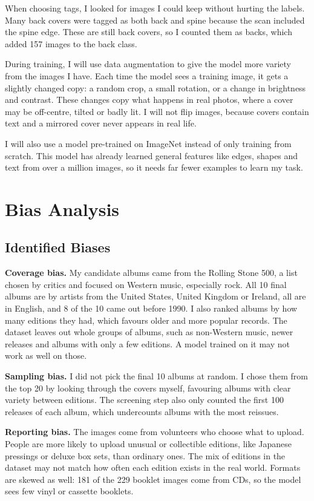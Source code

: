 \documentclass[10pt,a4paper,twocolumn]{article}
\begin{document}
When choosing tags, I looked for images I could keep without hurting the labels. Many back covers were tagged as both back and spine because the scan included the spine edge. These are still back covers, so I counted them as backs, which added 157 images to the back class.

During training, I will use data augmentation to give the model more variety from the images I have. Each time the model sees a training image, it gets a slightly changed copy: a random crop, a small rotation, or a change in brightness and contrast. These changes copy what happens in real photos, where a cover may be off-centre, tilted or badly lit. I will not flip images, because covers contain text and a mirrored cover never appears in real life.

I will also use a model pre-trained on ImageNet instead of only training from scratch. This model has already learned general features like edges, shapes and text from over a million images, so it needs far fewer examples to learn my task.

\section{Bias Analysis}

\subsection{Identified Biases}
\textbf{Coverage bias.} My candidate albums came from the Rolling Stone 500, a list chosen by critics and focused on Western music, especially rock. All 10 final albums are by artists from the United States, United Kingdom or Ireland, all are in English, and 8 of the 10 came out before 1990. I also ranked albums by how many editions they had, which favours older and more popular records. The dataset leaves out whole groups of albums, such as non-Western music, newer releases and albums with only a few editions. A model trained on it may not work as well on those.

\textbf{Sampling bias.} I did not pick the final 10 albums at random. I chose them from the top 20 by looking through the covers myself, favouring albums with clear variety between editions. The screening step also only counted the first 100 releases of each album, which undercounts albums with the most reissues.

\textbf{Reporting bias.} The images come from volunteers who choose what to upload. People are more likely to upload unusual or collectible editions, like Japanese pressings or deluxe box sets, than ordinary ones. The mix of editions in the dataset may not match how often each edition exists in the real world. Formats are skewed as well: 181 of the 229 booklet images come from CDs, so the model sees few vinyl or cassette booklets.
\end{document}

